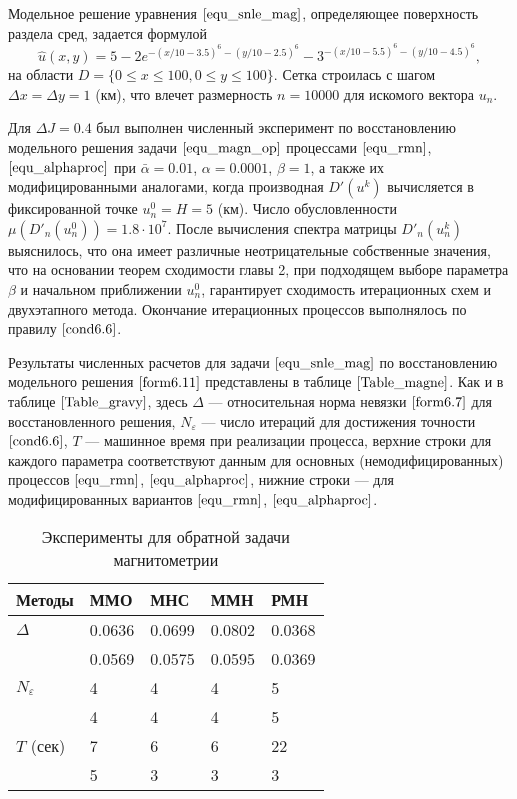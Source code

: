 Модельное решение уравнения $\eqref{equ_snle_mag}$, определяющее поверхность раздела сред, задается формулой \cite{AkMisDer2014}
\begin{equation}\label{form6.11}
\hat{u}(x,y)=5-2e^{-(x/10-3.5)^6-(y/10-2.5)^6}-
3^{-(x/10-5.5)^6-(y/10-4.5)^6},
\end{equation}
на области $D=\{0\le x \le 100, 0\le y\le 100\}$. Сетка строилась с шагом $\Delta x=\Delta y = 1$ (км), что влечет размерность $n=10000$ для искомого вектора $u_n$.

Для $\Delta J=0.4$  был выполнен численный эксперимент по восстановлению модельного решения задачи $\eqref{equ_magn_op}$ процессами $\eqref{equ_rmn}$, $\eqref{equ_alphaproc}$ при $\bar\alpha=0.01$, $\alpha = 0.0001$, $\beta=1$, а также их модифицированными аналогами, когда производная $D'(u^k)$ вычисляется в фиксированной точке $u_n^0=H=5$ (км). Число обусловленности $\mu(D'_n(u_n^0))=1.8\cdot 10^7$. После вычисления спектра матрицы $D'_n(u_n^k)$ выяснилось, что она имеет различные неотрицательные собственные значения, что на основании теорем сходимости главы 2, при подходящем выборе параметра $\beta$ и начальном приближении $u_n^0$, гарантирует сходимость итерационных схем и двухэтапного метода. Окончание итерационных процессов выполнялось по правилу $\eqref{cond6.6}$.

Результаты численных расчетов для задачи $\eqref{equ_snle_mag}$ по восстановлению модельного решения $\eqref{form6.11}$ представлены в таблице $\ref{Table_magne}$. Как и в таблице $\ref{Table_gravy}$, здесь $\Delta$ --- относительная норма невязки $\eqref{form6.7}$ для восстановленного решения, $N_\varepsilon$ --- число итераций для достижения точности $\eqref{cond6.6}$, $T$ --- машинное время при реализации процесса, верхние строки для каждого параметра соответствуют данным для основных (немодифицированных) процессов $\eqref{equ_rmn}$, $\eqref{equ_alphaproc}$, нижние строки --- для модифицированных вариантов $\eqref{equ_rmn}$, $\eqref{equ_alphaproc}$.
\begin{table}[H]
	\centering
	\caption{Эксперименты для обратной задачи магнитометрии}
	\label{Table_magne}
	\begin{tabular}{|p{}|p{}|p{}|p{}|p{}|}
		\hline
		\rule{0cm}{0.5cm}
		\textbf{Методы} & \textbf{ММО} & \textbf{МНС} & \textbf{ММН} & \textbf{РМН} \\ \hline
		\rule{0cm}{0.5cm}
		{$\Delta$} & 0.0636 & 0.0699 & 0.0802 & 0.0368	 \\ \cline{2-5} 
		\rule{0cm}{0.5cm}
		&  0.0569   & 0.0575    &  0.0595   &  0.0369   \\ \hline
		\rule{0cm}{0.5cm}
		{$N_\varepsilon$} & 4  &  4   &   4  &  5    \\ \cline{2-5}
		\rule{0cm}{0.5cm}
		&  4   &   4  &  4   &  5   \\ \hline
		\rule{0cm}{0.5cm}
		{$T$ (сек)}    &  7   &  6   &  6  & 22    \\ \cline{2-5}
		\rule{0cm}{0.5cm}
		& 5    & 3    &  3   &   3  \\ \hline
	\end{tabular}
\end{table}

